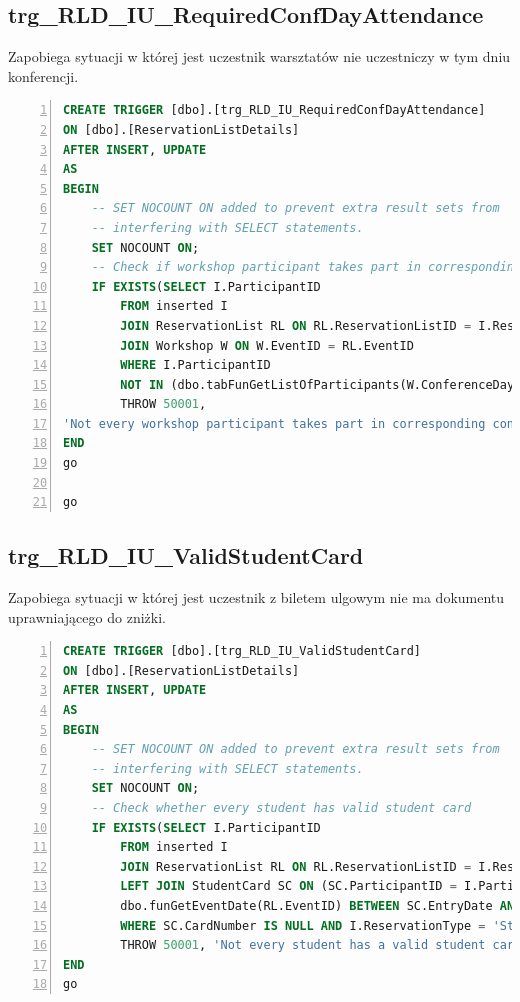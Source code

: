 \documentclass[]{article}
\begin{document}
	\subsection{trg\_RLD\_IU\_RequiredConfDayAttendance}
Zapobiega sytuacji w której jest uczestnik warsztatów nie uczestniczy w tym dniu konferencji.
\begin{lstlisting}[language=SQL,
showspaces=false,
basicstyle=\ttfamily,
numbers=left,
numberstyle=\tiny,
tabsize=2,
backgroundcolor=\color{lightg},
keywordstyle=\color{lightblue},
commentstyle=\color{gray}]
CREATE TRIGGER [dbo].[trg_RLD_IU_RequiredConfDayAttendance]
ON [dbo].[ReservationListDetails]
AFTER INSERT, UPDATE
AS
BEGIN
	-- SET NOCOUNT ON added to prevent extra result sets from
	-- interfering with SELECT statements.
	SET NOCOUNT ON;
	-- Check if workshop participant takes part in corresponding conference day
	IF EXISTS(SELECT I.ParticipantID
		FROM inserted I
		JOIN ReservationList RL ON RL.ReservationListID = I.ReservationListID
		JOIN Workshop W ON W.EventID = RL.EventID
		WHERE I.ParticipantID
		NOT IN (dbo.tabFunGetListOfParticipants(W.ConferenceDayID)))
		THROW 50001,
'Not every workshop participant takes part in corresponding conference day.', 1
END
go

go
\end{lstlisting}

	\subsection{trg\_RLD\_IU\_ValidStudentCard}
Zapobiega sytuacji w której jest uczestnik z biletem ulgowym nie ma dokumentu uprawniającego do zniżki.
\begin{lstlisting}[language=SQL,
showspaces=false,
basicstyle=\ttfamily,
numbers=left,
numberstyle=\tiny,
tabsize=2,
backgroundcolor=\color{lightg},
keywordstyle=\color{lightblue},
commentstyle=\color{gray}]
CREATE TRIGGER [dbo].[trg_RLD_IU_ValidStudentCard]
ON [dbo].[ReservationListDetails]
AFTER INSERT, UPDATE
AS
BEGIN
	-- SET NOCOUNT ON added to prevent extra result sets from
	-- interfering with SELECT statements.
	SET NOCOUNT ON;
	-- Check whether every student has valid student card 
	IF EXISTS(SELECT I.ParticipantID
		FROM inserted I
		JOIN ReservationList RL ON RL.ReservationListID = I.ReservationListID
		LEFT JOIN StudentCard SC ON (SC.ParticipantID = I.ParticipantID AND
		dbo.funGetEventDate(RL.EventID) BETWEEN SC.EntryDate AND SC.ExpiryDate)
		WHERE SC.CardNumber IS NULL AND I.ReservationType = 'Student')
		THROW 50001, 'Not every student has a valid student card.', 1
END
go

\end{lstlisting}
\end{document}

